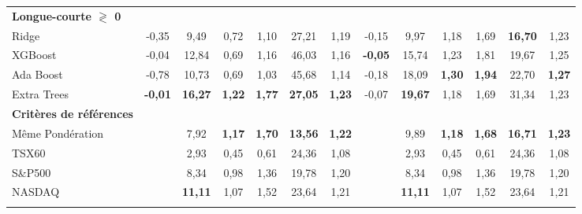 \documentclass[11pt]{article}
\begin{document}
\begin{table}[h]
{\begin{tabular}{l *{6}{S[table-format=2.2]} | *{6}{S[table-format=2.2]}}
\textbf{Longue-courte $\gtrless$ 0} & & & & & & & & & & & & \\
\addlinespace[0.1cm]
Ridge & -0,35 & 9,49 & 0,72 & 1,10 & 27,21 & 1,19 & -0,15 & 9,97 & 1,18 & 1,69 & \bfseries\color{Green}16,70 & 1,23 \\ \addlinespace[0.1cm]
XGBoost & -0,04 & 12,84 & 0,69 & 1,16 & 46,03 & 1,16 & \bfseries\color{Green}-0,05 & 15,74 & 1,23 & 1,81 & 19,67 & 1,25 \\ \addlinespace[0.1cm]
Ada Boost & -0,78 & 10,73 & 0,69 & 1,03 & 45,68 & 1,14 & -0,18 & 18,09 & \bfseries1,30 & \bfseries1,94 & 22,70 & \bfseries\color{Green}1,27 \\ \addlinespace[0.1cm]
Extra Trees & \bfseries\color{Green}-0,01 & \bfseries16,27 & \bfseries1,22 & \bfseries1,77 & \bfseries27,05 &\bfseries1,23 & -0,07 & \bfseries19,67 & 1,18 & 1,69 & 31,34 & 1,23 \\ \addlinespace[0.1cm]
\textbf{Critères de références} & & & & & & & & & & & & \\
\addlinespace[0.1cm]
Même Pondération & & 7,92 & \bfseries1,17 & \bfseries1,70 & \bfseries\color{Green}13,56 & \bfseries1,22 & & 9,89 & \bfseries1,18 & \bfseries1,68 & \bfseries16,71 & \bfseries1,23 \\ 
\addlinespace[0.1cm]
TSX60 & & 2,93 & 0,45 & 0,61 & 24,36 & 1,08 & & 2,93 & 0,45 & 0,61 & 24,36 & 1,08 \\ 
\addlinespace[0.1cm]
S\&P500 & & 8,34 & 0,98 & 1,36 & 19,78 & 1,20 & & 8,34 & 0,98 & 1,36 & 19,78 & 1,20 \\ 
\addlinespace[0.1cm]
NASDAQ & & \bfseries11,11 & 1,07 & 1,52 & 23,64 & 1,21 & & \bfseries11,11 & 1,07 & 1,52 & 23,64 & 1,21 \\ 
\addlinespace[0.1cm]
\bottomrule
\midrule
\end{tabular}}
\end{table}


\newpage
\end{document}
